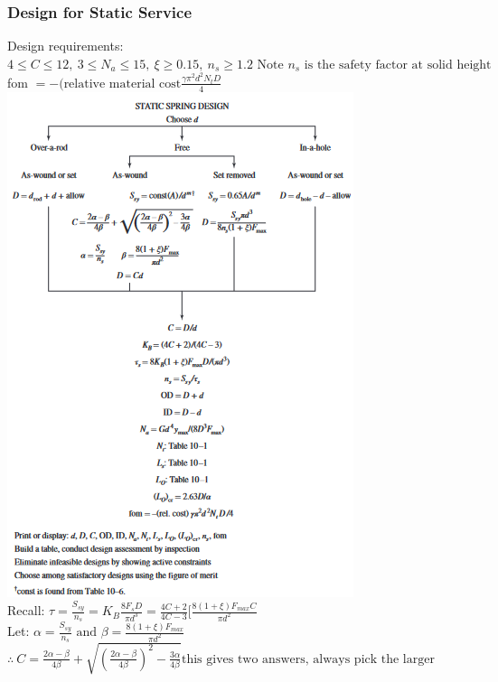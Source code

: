 \documentclass[11pt, fleqn]{article}
\begin{document}
\subsubsection{Design for Static Service}
Design requirements: $4\leq C \leq 12, \: 3\leq N_a\leq 15, \: \xi \geq 0.15, \: n_s \geq 1.2 \text{ Note $n_s$ is the safety factor at solid height}$\\
fom $= -(\text{relative material cost} \frac{\gamma\pi^2d^2N_tD}{4}$\\
\includegraphics[scale=0.9]{Springs/Fig10-3.png}\\
Recall: $\tau = \frac{S_{sy}}{n_s} = K_B\frac{8F_sD}{\pi d^3} = \frac{4C+2}{4C-3}[\frac{8(1+\xi)F_{max}C}{\pi d^2}$\\
Let: $\alpha = \frac{S_{sy}}{n_s} \text{ and } \beta = \frac{8(1+\xi)F_{max}}{\pi d^2}$\\
$\therefore \: C = \frac{2\alpha - \beta}{4\beta} + \sqrt{(\frac{2\alpha - \beta}{4\beta})^2 - \frac{3\alpha}{4\beta}} \text{this gives two answers, always pick the larger}$\\
\end{document}
